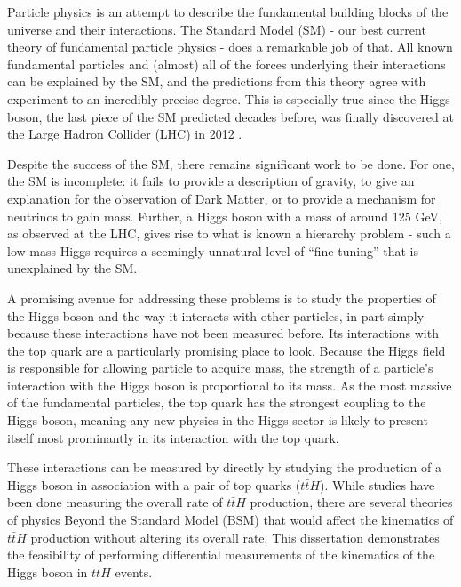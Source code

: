 Particle physics is an attempt to describe the fundamental building blocks of the universe and their interactions. The Standard Model (SM) - our best current theory of fundamental particle physics - does a remarkable job of that. All known fundamental particles and (almost) all of the forces underlying their interactions can be explained by the SM, and the predictions from this theory agree with experiment to an incredibly precise degree. This is especially true since the Higgs boson, the last piece of the SM predicted decades before, was finally discovered at the Large Hadron Collider (LHC) in 2012 \cite{HIGG-2012-27}. 

Despite the success of the SM, there remains significant work to be done. For one, the SM is incomplete: it fails to provide a description of gravity, to give an explanation for the observation of Dark Matter, or to provide a mechanism for neutrinos to gain mass. Further, a Higgs boson with a mass of around 125 GeV, as observed at the LHC, gives rise to what is known a hierarchy problem - such a low mass Higgs requires a seemingly unnatural level of ``fine tuning'' that is unexplained by the SM.

A promising avenue for addressing these problems is to study the properties of the Higgs boson and the way it interacts with other particles, in part simply because these interactions have not been measured before. Its interactions with the top quark are a particularly promising place to look. Because the Higgs field is responsible for allowing particle to acquire mass, the strength of a particle's interaction with the Higgs boson is proportional to its mass. As the most massive of the fundamental particles, the top quark has the strongest coupling to the Higgs boson, meaning any new physics in the Higgs sector is likely to present itself most prominantly in its interaction with the top quark.

These interactions can be measured by directly by studying the production of a Higgs boson in association with a pair of top quarks ($t\bar{t}H$). While studies have been done measuring the overall rate of $t\bar{t}H$ production, there are several theories of physics Beyond the Standard Model (BSM) that would affect the kinematics of $t\bar{t}H$ production without altering its overall rate. This dissertation demonstrates the feasibility of performing differential measurements of the kinematics of the Higgs boson in $t\bar{t}H$ events.


